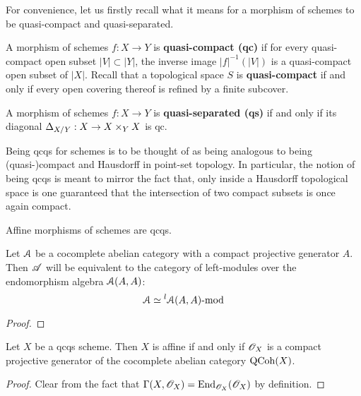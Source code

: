             For convenience, let us firstly recall what it means for a morphism of schemes to be quasi-compact and quasi-separated.
            \begin{definition} \label{def: qcqs}
                A morphism of schemes $f: X \to Y$ is \textbf{quasi-compact (qc)} if for every quasi-compact open subset $|V| \subset |Y|$, the inverse image $|f|^{-1}(|V|)$ is a quasi-compact open subset of $|X|$. Recall that a topological space $S$ is \textbf{quasi-compact} if and only if every open covering thereof is refined by a finite subcover. 

                A morphism of schemes $f: X \to Y$ is \textbf{quasi-separated (qs)} if and only if its diagonal $\Delta_{X/Y}: X \to X \x_Y X$ is qc.
            \end{definition}
            \begin{remark}
                Being qcqs for schemes is to be thought of as being analogous to being (quasi-)compact and Hausdorff in point-set topology. In particular, the notion of being qcqs is meant to mirror the fact that, only inside a Hausdorff topological space is one guaranteed that the intersection of two compact subsets is once again compact.  
            \end{remark}
            \begin{lemma} \label{lemma: affine_morphisms_are_qcqs}
                Affine morphisms of schemes are qcqs.
            \end{lemma}
            \begin{lemma}
                Let $\mathcal{A}$ be a cocomplete abelian category with a compact projective generator $A$. Then $\mathscr{A}$ will be equivalent to the category of left-modules over the endomorphism algebra $\mathcal{A}(A, A)$:
                    $$\mathcal{A} \simeq {}^l\mathcal{A}(A, A)\text{-}\mathrm{mod}$$
            \end{lemma}
                \begin{proof}
                    
                \end{proof}
            \begin{theorem} \label{theorem: compact_generation_of_qcoh_on_affine_schemes}
                Let $X$ be a qcqs scheme. Then $X$ is affine if and only if $\mathscr{O}_X$ is a compact projective generator of the cocomplete abelian category $\mathrm{QCoh}(X)$.
            \end{theorem}
                \begin{proof}
                    Clear from the fact that $\Gamma(X, \mathscr{O}_X) = \mathrm{End}_{\mathscr{O}_X}(\mathscr{O}_X)$ by definition.
                \end{proof}
